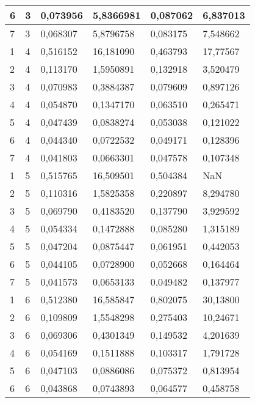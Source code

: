 \documentclass[a4paper,titlepage,11pt,floatssmall]{mwrep}
\begin{document}
\begin{table}[H]
\begin{tabular}{|l|l|l|l|l|l|}
6           & 3             & 0,073956 & 5,8366981 & 0,087062 & 6,837013 \\ \hline
7           & 3             & 0,068307 & 5,8796758 & 0,083175 & 7,548662 \\ \hline
1           & 4             & 0,516152 & 16,181090 & 0,463793 & 17,77567 \\ \hline
2           & 4             & 0,113170 & 1,5950891 & 0,132918 & 3,520479 \\ \hline
3           & 4             & 0,070983 & 0,3884387 & 0,079609 & 0,897126 \\ \hline
4           & 4             & 0,054870 & 0,1347170 & 0,063510 & 0,265471 \\ \hline
5           & 4             & 0,047439 & 0,0838274 & 0,053038 & 0,121022 \\ \hline
6           & 4             & 0,044340 & 0,0722532 & 0,049171 & 0,128396 \\ \hline
7           & 4             & 0,041803 & 0,0663301 & 0,047578 & 0,107348 \\ \hline
1           & 5             & 0,515765 & 16,509501 & 0,504384 & NaN      \\ \hline
2           & 5             & 0,110316 & 1,5825358 & 0,220897 & 8,294780  \\ \hline
3           & 5             & 0,069790 & 0,4183520 & 0,137790 & 3,929592 \\ \hline
4           & 5             & 0,054334 & 0,1472888 & 0,085280 & 1,315189  \\ \hline
5           & 5             & 0,047204 & 0,0875447 & 0,061951 & 0,442053 \\ \hline
6           & 5             & 0,044105 & 0,0728900 & 0,052668 & 0,164464 \\ \hline
7           & 5             & 0,041573 & 0,0653133 & 0,049482 & 0,137977 \\ \hline
1           & 6             & 0,512380 & 16,585847 & 0,802075 & 30,13800  \\ \hline
2           & 6             & 0,109809 & 1,5548298 & 0,275403 & 10,24671 \\ \hline
3           & 6             & 0,069306 & 0,4301349 & 0,149532 & 4,201639 \\ \hline
4           & 6             & 0,054169 & 0,1511888 & 0,103317 & 1,791728 \\ \hline
5           & 6             & 0,047103 & 0,0886086 & 0,075372 & 0,813954 \\ \hline
6           & 6             & 0,043868 & 0,0743893 & 0,064577 & 0,458758 \\ \hline

\end{tabular}
\end{table}
\end{document}
